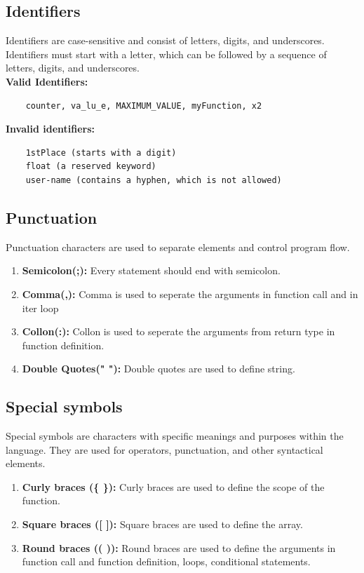 \documentclass[12pt]{article}
\begin{document}
\subsection{Identifiers}
Identifiers are case-sensitive and consist of letters, digits, and underscores. Identifiers must start with a letter, which can be followed by a sequence of letters, digits, and underscores.\\

\textbf{Valid Identifiers:} 
\begin{verbatim}
    counter, va_lu_e, MAXIMUM_VALUE, myFunction, x2
\end{verbatim}
\textbf{Invalid identifiers:} 
\begin{verbatim}
    1stPlace (starts with a digit)
    float (a reserved keyword)
    user-name (contains a hyphen, which is not allowed)
\end{verbatim}

\subsection{Punctuation}
Punctuation characters are used to separate elements and control program flow. 
\begin{enumerate}
    \item \textbf{Semicolon(;):} Every statement should end with semicolon.
    \item \textbf{Comma(,):} Comma is used to seperate the arguments in function call and in iter loop
    \item \textbf{Collon(:):} Collon is used to seperate the arguments from return type in function definition.
    \item \textbf{Double Quotes(" "):} Double quotes are used to define string.
\end{enumerate}

\subsection{Special symbols}
Special symbols are characters with specific meanings and purposes within the language. They are used for operators, punctuation, and other syntactical elements.
\begin{enumerate}
    \item \textbf{Curly braces (\{ \}):} Curly braces are used to define the scope of the function.
    \item \textbf{Square braces ([ ]):} Square braces are used to define the array.
    \item \textbf{Round braces (( )):} Round braces are used to define the arguments in function call and function definition, loops, conditional statements.
\end{enumerate}
\end{document}
